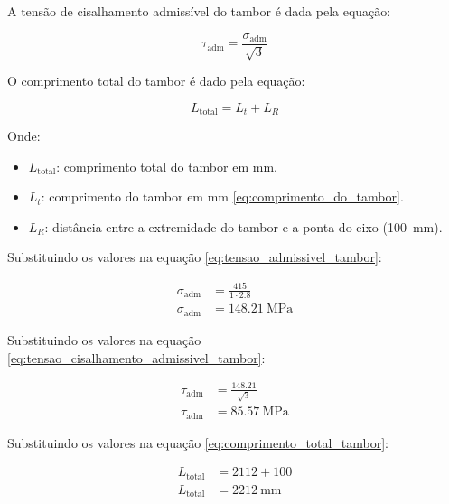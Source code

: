A tensão de cisalhamento admissível do tambor é dada pela equação:

\begin{equation}
  \tau_{\text{adm}} = \frac{\sigma_{\text{adm}}}{\sqrt{3}}
  \label{eq:tensao_cisalhamento_admissivel_tambor}
\end{equation}

O comprimento total do tambor é dado pela equação:

\begin{equation}
  L_{\text{total}} = L_t + L_R
  \label{eq:comprimento_total_tambor}
\end{equation}

Onde:

\begin{itemize}
  \item $L_{\text{total}}$: comprimento total do tambor em \si{\milli\meter}.
  \item $L_t$: comprimento do tambor em \si{\milli\meter} \eqref{eq:comprimento_do_tambor}.
  \item $L_R$: distância entre a extremidade do tambor e a ponta do eixo (\SI{100}{\milli\meter}).
\end{itemize}

\vspace{1em}

Substituindo os valores na equação \eqref{eq:tensao_admissivel_tambor}:

\begin{align*}
  \sigma_{\text{adm}} & = \frac{415}{1 \cdot \num{2.8}}           \\
  \sigma_{\text{adm}} & = \boxed{\SI{148.21}{\mega\pascal}}
\end{align*}

Substituindo os valores na equação \eqref{eq:tensao_cisalhamento_admissivel_tambor}:

\begin{align*}
  \tau_{\text{adm}} & = \frac{\num{148.21}}{\sqrt{3}}          \\
  \tau_{\text{adm}} & = \boxed{\SI{85.57}{\mega\pascal}}
\end{align*}

Substituindo os valores na equação \eqref{eq:comprimento_total_tambor}:

\begin{align*}
  L_{\text{total}} & = 2112 + 100                      \\
  L_{\text{total}} & = \boxed{\SI{2212}{\milli\meter}}
\end{align*}


